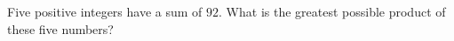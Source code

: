 Five positive integers have a sum of $92$. What is the greatest possible product of these five numbers?
